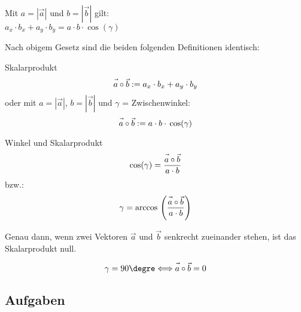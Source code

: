 \begin{gesetz}{}{}
  Mit $a = |\vec{a}|$ und $b = |\vec{b}|$ gilt:\\
  $a_x\cdot{}b_x + a_y\cdot{}b_y = a\cdot{}b\cdot{}\cos(\gamma)$
\end{gesetz}
  \newpage

Nach obigem Gesetz sind die beiden folgenden Definitionen identisch:
\begin{definition}{Skalarprodukt}{}
  $$\vec{a\vphantom{b}}\circ\vec{b} := a_x\cdot{}b_x + a_y \cdot{} b_y$$
oder mit $a=|\vec{a}|$, $b=|\vec{b}|$ und $\gamma$ = Zwischenwinkel:
  $$\vec{a\vphantom{b}}\circ\vec{b} := a\cdot{}b\cdot{}\cos({\gamma})$$
\end{definition}


\begin{gesetz}{Winkel und Skalarprodukt}{}
  $$\cos(\gamma) = \frac{\vec{a\vphantom{b}}\circ\vec{b}}{a\cdot b}$$
  bzw.:
  $$\gamma = \arccos{} \left(\frac{\vec{a\vphantom{b}}\circ\vec{b}}{a\cdot b}\right)$$
  
\end{gesetz}

\begin{bemerkung}{}{}
  Genau dann, wenn zwei Vektoren $\vec{a}$ und $\vec{b}$ senkrecht
  zueinander stehen, ist das Skalarprodukt null.

  $$\gamma=90\degre   \Longleftrightarrow  \vec{a\vphantom{b}}\circ\vec{b}=0$$
  \end{bemerkung}


\subsection*{Aufgaben}

\newpage
